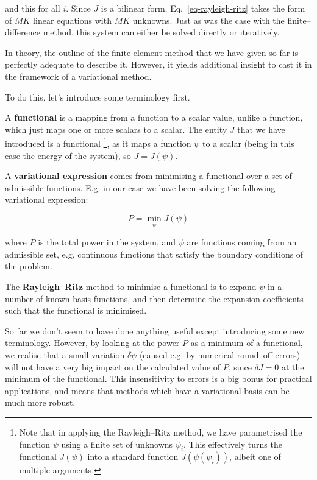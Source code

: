 and this for all $i$. Since $J$ is a bilinear form, Eq.~\ref{eq-rayleigh-ritz} takes the form of $MK$ linear equations with $MK$ unknowns. Just as was the case with the finite--difference method, this system can either be solved directly or iteratively.


\pagebreak



In theory, the outline of the finite element method that we have given so far is perfectly adequate to describe it. However, it yields additional insight to cast it in the framework of a variational method.

To do this, let's introduce some terminology first.

A \textbf{functional} is a mapping from a function to a scalar value, unlike a function, which just maps one or more scalars to a scalar. The entity $J$ that we have introduced is a functional \footnote{Note that in applying the Rayleigh--Ritz method, we have parametrised the function $\psi$ using a finite set of unknowns $\psi_i$. This effectively turns the functional $J(\psi)$ into a standard function $J(\psi(\psi_i))$, albeit one of multiple arguments.}, as it maps a function $\psi$ to a scalar (being in this case the energy of the system), so $J=J(\psi)$.

A \textbf{variational expression} comes from minimising a functional over a set of admissible functions. E.g. in our case we have been solving the following variational expression:

\begin{equation}
P = \min_\psi J(\psi)
\end{equation} 

where $P$ is the total power in the system, and $\psi$ are functions coming from an admissible set, e.g. continuous functions that satisfy the boundary conditions of the problem.

The \textbf{Rayleigh--Ritz} method to minimise a functional is to expand $\psi$ in a number of known basis functions, and then determine the expansion coefficients such that the functional is minimised.

So far we don't seem to have done anything useful except introducing some new terminology. However, by looking at the power $P$ as a minimum of a functional, we realise that a small variation $\delta \psi$ (caused e.g. by numerical round--off errors) will not have a very big impact on the calculated value of $P$, since $\delta J=0$ at the minimum of the functional. This insensitivity to errors is a big bonus for practical applications, and means that methods which have a variational basis can be much more robust.

